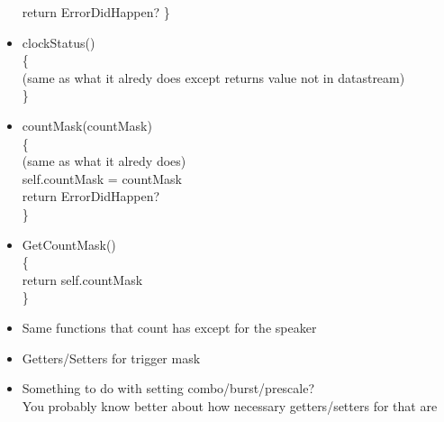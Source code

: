 \documentclass[12pt,a4paper]{article}
\begin{document}
\begin{itemize}
return ErrorDidHappen?
\}\\
\item
clockStatus()\\
\{\\
(same as what it alredy does except returns value not in datastream)\\
\}\\
\item
countMask(countMask)\\
\{\\
(same as what it alredy does)\\
self.countMask = countMask\\
return ErrorDidHappen?\\
\}\\
\item
GetCountMask()\\
\{\\
return self.countMask\\
\}\\
\item
Same functions that count has except for the speaker\\
\item
Getters/Setters for trigger mask 
\item
Something to do with setting combo/burst/prescale?\\
You probably know better about how necessary getters/setters for that are\\
\end{itemize}
\end{document}
